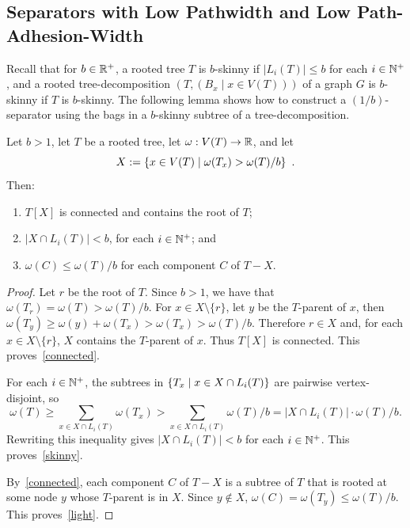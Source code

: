 \documentclass{patmorin}
\renewcommand{\ge}{\geqslant}
\renewcommand{\le}{\leqslant}
\DeclarePairedDelimiter{\set}{\{}{\}}
\begin{document}
\subsection{Separators with Low Pathwidth and Low Path-Adhesion-Width}\label{lowpw}

Recall that for $b\in\mathbb{R}^+$, a rooted tree $T$ is $b$-skinny if $|L_i(T)|\le b$ for each $i\in\mathbb{N}^+$, and a rooted tree-decomposition $(T,(B_x\mid x\in V(T)))$ of a graph $G$ is $b$-skinny if $T$ is $b$-skinny.  The following lemma shows how to construct a $(1/b)$-separator using the bags in a $b$-skinny subtree of a tree-decomposition.

\begin{lem}\label{low_pathwidth_separator}
  Let $b>1$, let $T$ be a rooted tree, let $\omega:V(T)\to\mathbb{R}$, and let
  \[
    X:=\set{x\in V(T)\mid\omega(T_x)>\omega(T)/b} \enspace.
  \]
  Then:
  \begin{enumerate}[nosep,nolistsep,label=(\alph*)]
    \item\label{connected} $T[X]$ is connected and contains the root of $T$;
    \item\label{skinny} $|X\cap L_i(T)|< b$, for each $i\in\mathbb{N}^+$; and
    \item\label{light} $\omega(C)\le \omega(T)/b$ for each component $C$ of $T-X$.
  \end{enumerate}
\end{lem}

\begin{proof}
  Let $r$ be the root of $T$.  Since $b>1$, we have that $\omega(T_r)=\omega(T)>\omega(T)/b$. %
  For $x\in X\setminus\{r\}$, let $y$ be the $T$-parent of $x$, then
  $\omega(T_y)\ge \omega(y)+\omega(T_x)>\omega(T_x)>\omega(T)/b$.
  Therefore $r\in X$ and, for each $x\in X\setminus\{r\}$, $X$ contains the $T$-parent of $x$. Thus $T[X]$ is connected.
  This proves~\ref{connected}.

  For each $i\in\mathbb{N}^+$, the subtrees in $\set{T_x \mid x\in X\cap L_i(T)}$ are pairwise vertex-disjoint, so
  \[
    \omega(T) \ge \sum_{x\in X\cap L_i(T)} \omega(T_x)> \sum_{x\in X\cap L_i(T)}\omega(T)/b = |X\cap L_i(T)|\cdot\omega(T)/b.
  \]
  Rewriting this inequality gives $|X\cap L_i(T)|<b$ for each $i\in\mathbb{N}^+$.
  This proves~\ref{skinny}.

  By~\ref{connected}, each component $C$ of $T-X$ is a subtree of $T$ that is rooted at some node $y$ whose $T$-parent is in $X$.  Since  $y\not\in X$, $\omega(C)=\omega(T_y)\le \omega(T)/b$.
  This proves~\ref{light}.
\end{proof}
\end{document}
